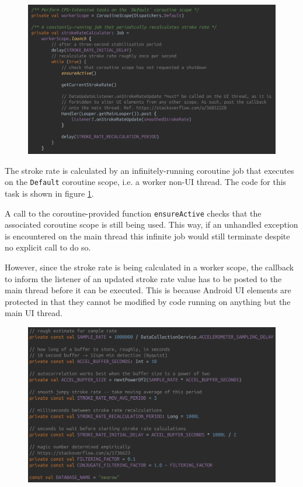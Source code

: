 \documentclass[11pt,twoside,a4paper]{report}
\begin{document}
\begin{figure}[h!]
  \centering
  \includegraphics[width=1.0\textwidth]{code-dataProcessor-strokeRateCalculator.png}
  \caption{}
  \label{fig:strokeRateCalculator}
\end{figure}

The stroke rate is calculated by an infinitely-running coroutine job that executes on the \texttt{Default} coroutine scope, i.e. a worker non-UI thread. The code for this task is shown in figure \ref{fig:strokeRateCalculator}. 

A call to the coroutine-provided function \texttt{ensureActive} checks that the associated coroutine scope is still being used. This way, if an unhandled exception is encountered on the main thread this infinite job would still terminate despite no explicit call to do so.

However, since the stroke rate is being calculated in a worker scope, the callback to inform the listener of an updated stroke rate value has to be posted to the main thread before it can be executed. This is because Android UI elements are protected in that they cannot be modified by code running on anything but the main UI thread.

\begin{figure}[h!]
  \centering
  \includegraphics[width=1.0\textwidth]{code-dataProcessor-companion.png}
  \caption{}
  \label{fig:companionDataProcessor}
\end{figure}
\end{document}
